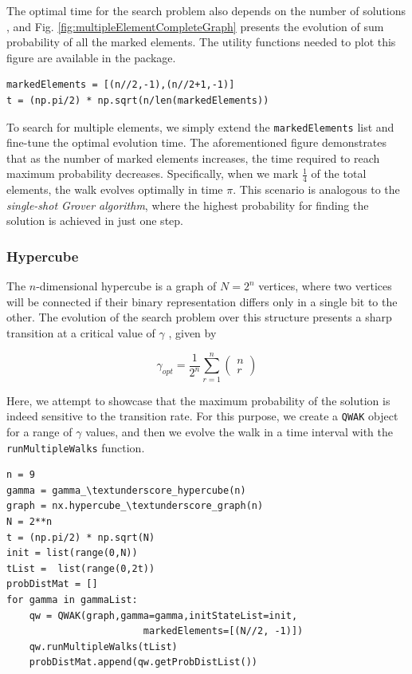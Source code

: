 \documentclass[main.tex]{subfiles}
\begin{document}
The optimal time for the search problem also depends on the number of solutions
\cite{boyer1996,Lugao2022}, and Fig. \ref{fig:multipleElementCompleteGraph}
presents the evolution of sum probability of all the marked elements. The
utility functions needed to plot this figure are available in the package. 

\begin{lstlisting}[style=code]
markedElements = [(n//2,-1),(n//2+1,-1)]
t = (np.pi/2) * np.sqrt(n/len(markedElements))
\end{lstlisting}

To search for multiple elements, we simply extend the \texttt{markedElements}
list and fine-tune the optimal evolution time. The aforementioned figure
demonstrates that as the number of marked elements increases, the time required
to reach maximum probability decreases. Specifically, when we mark $
\frac{1}{4} $ of the total elements, the walk evolves optimally in time $\pi$.
This scenario is analogous to the \textit{single-shot Grover algorithm}, where
the highest probability for finding the solution is achieved in just one step.

\subsubsection{Hypercube}

The $n$-dimensional hypercube is a graph of $N=2^n$ vertices, where two
vertices will be connected if their binary representation differs only in a
single bit to the other. The evolution of the search problem over this
structure presents a sharp transition at a critical value of $\gamma$ \cite{childs2004}, given by

\begin{equation}
    \gamma_{opt} =\frac{1}{2^n} \sum_{r=1}^n\left(\begin{array}{l}
        n \\
        r
        \end{array}\right) %
\end{equation}

Here, we attempt to showcase that the maximum probability of the solution is
indeed sensitive to the transition rate. For this purpose, we create a
\texttt{QWAK} object for a range of $\gamma$ values, and then we evolve the
walk in a time interval with the \texttt{runMultipleWalks} function.

\begin{lstlisting}[style=code,escapeinside={__}]
n = 9
gamma = gamma_\textunderscore_hypercube(n)
graph = nx.hypercube_\textunderscore_graph(n)
N = 2**n
t = (np.pi/2) * np.sqrt(N)
init = list(range(0,N))
tList =  list(range(0,2t))
probDistMat = []
for gamma in gammaList:
    qw = QWAK(graph,gamma=gamma,initStateList=init,
                        markedElements=[(N//2, -1)])
    qw.runMultipleWalks(tList)
    probDistMat.append(qw.getProbDistList())
\end{lstlisting}
\end{document}
